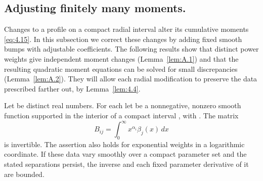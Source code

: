 \subsection{Adjusting finitely many moments.}\label{sec:A.1}
Changes to a profile on a compact radial interval alter its cumulative moments
\eqref{eq:4.15}. In this subsection we correct these changes by adding fixed smooth bumps
with adjustable coefficients. The following results show that distinct power weights give
independent moment changes (Lemma~\ref{lem:A.1}) and that the resulting quadratic moment
equations can be solved for small discrepancies (Lemma~\ref{lem:A.2}). They will allow
each radial modification to preserve the data prescribed farther out, by Lemma~\ref{lem:4.4}.

\begin{lemma}\label{lem:A.1}
Let  be distinct real numbers. For each
 let  be a nonnegative, nonzero
smooth function supported in the interior of a compact interval
, with
. The matrix
\[
  B_{ij}=\int_0^\infty x^{\alpha_i}\beta_j(x)\,dx
\]
is invertible. The assertion also holds for exponential weights in a logarithmic coordinate.
If these data vary smoothly over a compact parameter set and the stated separations persist,
the inverse and each fixed parameter derivative of it are bounded.
\end{lemma}

